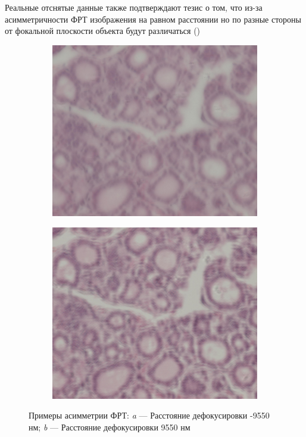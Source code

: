 Реальные отснятые данные также подтверждают тезис о том, что из-за асимметричности ФРТ изображения на равном расстоянии но по разные стороны от фокальной плоскости объекта будут различаться ()

\begin{figure}[!htbp]
	\begin{subfigure}[t]{0.45\linewidth}
		\centering
		\includegraphics[width=.95\linewidth]{my_folder/images/defocus-9550.jpg}
		\caption{}
		\label{fig:PSF_defocus-9550}
	\end{subfigure}
	\hfill
	\begin{subfigure}[t]{0.45\linewidth}
		\centering
		\includegraphics[width=.95\linewidth]{my_folder/images/defocus9950.jpg}
		\caption{}
		\label{fig:PSF_defocus9550}
	\end{subfigure}
	\caption{Примеры асимметрии ФРТ: {\itshape a} --- Расстояние дефокусировки -9550 нм; {\itshape b} --- Расстояние дефокусировки 9550 нм}
	\label{fig:PSF_example}
\end{figure}

